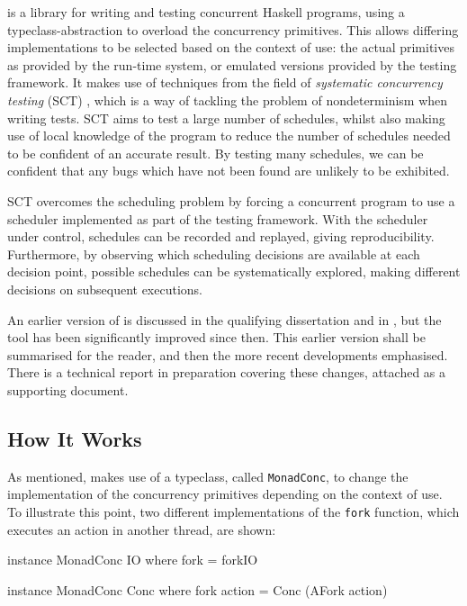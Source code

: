 \dejafu{} is a library for writing and testing concurrent Haskell
programs, using a typeclass-abstraction to overload the concurrency
primitives. This allows differing implementations to be selected based
on the context of use: the actual primitives as provided by the
run-time system, or emulated versions provided by the testing
framework. It makes use of techniques from the field of
\emph{systematic concurrency testing} (SCT) \citep{dpor, pbound,
  heisenbugs, empirical}, which is a way of tackling the problem of
nondeterminism when writing tests. SCT aims to test a large number of
schedules, whilst also making use of local knowledge of the program to
reduce the number of schedules needed to be confident of an accurate
result. By testing many schedules, we can be confident that any bugs
which have not been found are unlikely to be exhibited.

SCT overcomes the scheduling problem by forcing a concurrent program
to use a scheduler implemented as part of the testing framework. With
the scheduler under control, schedules can be recorded and replayed,
giving reproducibility. Furthermore, by observing which scheduling
decisions are available at each decision point, possible schedules can
be systematically explored, making different decisions on subsequent
executions.

An earlier version of \dejafu{} is discussed in the qualifying
dissertation and in \citep{dejafu}, but the tool has been
significantly improved since then. This earlier version shall be
summarised for the reader, and then the more recent developments
emphasised. There is a technical report in preparation covering these
changes, attached as a supporting document.

\subsection{How It Works}
\label{sec:progress-dejafu-hiw}

As mentioned, \dejafu{} makes use of a typeclass, called
\verb|MonadConc|, to change the implementation of the concurrency
primitives depending on the context of use. To illustrate this point,
two different implementations of the \verb|fork| function, which
executes an action in another thread, are shown:

\begin{haskellcode}
instance MonadConc IO where
  fork = forkIO

instance MonadConc Conc where
  fork action = Conc (AFork action)
\end{haskellcode}

